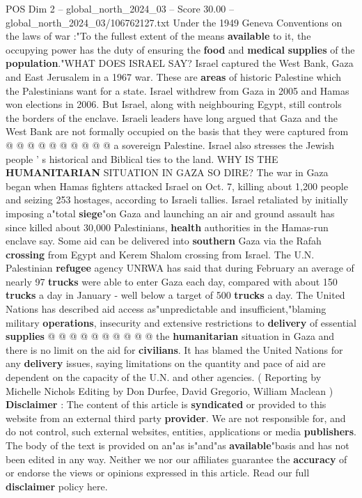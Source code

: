 \begin{textsample}{POS Dim 2 – global\_north\_2024\_03 – Score 30.00 – global\_north\_2024\_03/106762127.txt}
Under the 1949 Geneva Conventions on the laws of war :"To the fullest extent of the means \textbf{available} to it, the occupying power has the duty of ensuring the \textbf{food} and \textbf{medical} \textbf{supplies} of the \textbf{population}."WHAT DOES ISRAEL SAY?
Israel captured the West Bank, Gaza and East Jerusalem in a 1967 war.
These are \textbf{areas} of historic Palestine which the Palestinians want for a state.
Israel withdrew from Gaza in 2005 and Hamas won elections in 2006.
But Israel, along with neighbouring Egypt, still controls the borders of the enclave.
Israeli leaders have long argued that Gaza and the West Bank are not formally occupied on the basis that they were captured from @ @ @ @ @ @ @ @ @ @ a sovereign Palestine.
Israel also stresses the Jewish people ' s historical and Biblical ties to the land.
WHY IS THE \textbf{HUMANITARIAN} SITUATION IN GAZA SO DIRE?
The war in Gaza began when Hamas fighters attacked Israel on Oct. 7, killing about 1,200 people and seizing 253 hostages, according to Israeli tallies.
Israel retaliated by initially imposing a"total \textbf{siege}"on Gaza and launching an air and ground assault has since killed about 30,000 Palestinians, \textbf{health} authorities in the Hamas-run enclave say.
Some aid can be delivered into \textbf{southern} Gaza via the Rafah \textbf{crossing} from Egypt and Kerem Shalom crossing from Israel.
The U.N.
Palestinian \textbf{refugee} agency UNRWA has said that during February an average of nearly 97 \textbf{trucks} were able to enter Gaza each day, compared with about 150 \textbf{trucks} a day in January - well below a target of 500 \textbf{trucks} a day.
The United Nations has described aid access as"unpredictable and insufficient,"blaming military \textbf{operations}, insecurity and extensive restrictions to \textbf{delivery} of essential \textbf{supplies} @ @ @ @ @ @ @ @ @ @ the \textbf{humanitarian} situation in Gaza and there is no limit on the aid for \textbf{civilians}.
It has blamed the United Nations for any \textbf{delivery} issues, saying limitations on the quantity and pace of aid are dependent on the capacity of the U.N. and other agencies. ( Reporting by Michelle Nichols Editing by Don Durfee, David Gregorio, William Maclean ) \textbf{Disclaimer} : The content of this article is \textbf{syndicated} or provided to this website from an external third party \textbf{provider}.
We are not responsible for, and do not control, such external websites, entities, applications or media \textbf{publishers}.
The body of the text is provided on an"as is"and"as \textbf{available}"basis and has not been edited in any way.
Neither we nor our affiliates guarantee the \textbf{accuracy} of or endorse the views or opinions expressed in this article.
Read our full \textbf{disclaimer} policy here.

\end{textsample}
